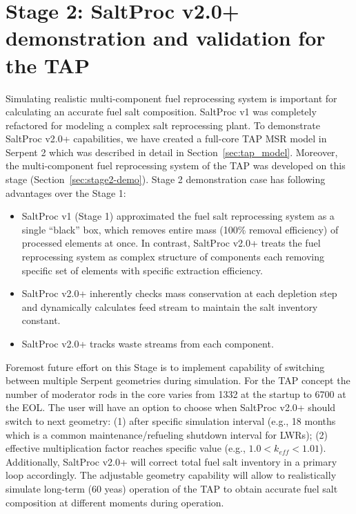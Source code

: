 \section{Stage 2: SaltProc v2.0+ demonstration and validation for the TAP}
Simulating realistic multi-component fuel reprocessing system is important for 
calculating an accurate fuel salt composition. SaltProc v1 was completely 
refactored for modeling a complex salt reprocessing plant. To demonstrate 
SaltProc v2.0+ capabilities, we have created a full-core \gls{TAP} 
\gls{MSR} model in Serpent 2 \cite{chaube_tap_2019} which was described in 
detail in Section~\ref{sec:tap_model}. Moreover, the multi-component fuel 
reprocessing system of the \gls{TAP} was developed on this stage 
(Section~\ref{sec:stage2-demo}). Stage 2 demonstration case has following 
advantages over the Stage 1:
\begin{itemize}
	\item SaltProc v1 (Stage 1) approximated the fuel salt reprocessing system 
	as a single ``black'' box, which removes entire mass (100\% removal 
	efficiency) of processed elements at once. In contrast, SaltProc v2.0+ 
	treats the fuel reprocessing system as complex structure of components 
	each removing specific set of elements with specific extraction 
	efficiency. 
	\item SaltProc v2.0+ inherently checks mass conservation at each depletion 
	step and dynamically calculates feed stream to maintain the salt inventory 
	constant.
	\item SaltProc v2.0+ tracks waste streams from each component.
\end{itemize}

Foremost future effort on this Stage is to implement capability of switching 
between multiple Serpent geometries during simulation. For the \gls{TAP} 
concept the number of moderator rods in the core varies from 1332 at the 
startup to 6700 at the \gls{EOL}. The user will have an option to choose when 
SaltProc v2.0+ should switch to next geometry: (1) after specific simulation 
interval (e.g., 18 months which is a common maintenance/refueling shutdown 
interval for \glspl{LWR}); (2) effective multiplication factor reaches 
specific value (e.g., $1.0<k_{eff} < 1.01$). Additionally, SaltProc v2.0+ will 
correct total fuel salt inventory in a primary loop accordingly. The 
adjustable geometry capability will allow to realistically simulate long-term 
(60 yeas) operation of the \gls{TAP} to obtain accurate fuel salt composition 
at different moments during operation.

